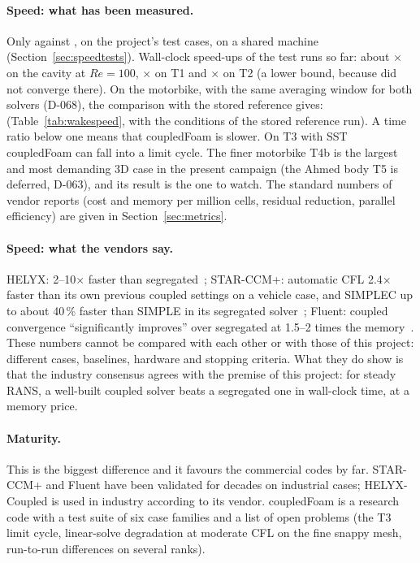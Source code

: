 \paragraph{Speed: what has been measured.} Only against ,
on the project's test cases, on a shared machine
(Section~\ref{sec:speedtests}). Wall-clock speed-ups of the test runs so
far: about $\times$ on the cavity at
$Re=100$, $\times$ on T1 and
$\times$ on T2 (a lower bound, because
 did not converge there). On the motorbike, with the
same averaging window for both solvers (D-068), the comparison with the
stored reference gives:  (Table~\ref{tab:wakespeed},
with the conditions of the stored reference run). A time ratio below one
means that coupledFoam is slower. On T3 with SST coupledFoam can fall
into a limit cycle. The finer motorbike T4b is the largest and most
demanding 3D case in the present campaign (the Ahmed body T5 is deferred, D-063), and its
result is the one to watch. The standard numbers of vendor reports (cost
and memory per million cells, residual reduction, parallel efficiency) are
given in Section~\ref{sec:metrics}.

\paragraph{Speed: what the vendors say.} HELYX: 2--10$\times$ faster than
segregated~\cite{cmp-HelyxCoupled}; STAR-CCM+: automatic CFL 2.4$\times$ faster
than its own previous coupled settings on a vehicle case, and SIMPLEC up
to about 40\,\% faster than SIMPLE in its segregated
solver~\cite{cmp-StarEffortless2020,cmp-StarSIMPLEC2023}; Fluent: coupled
convergence ``significantly improves'' over segregated at 1.5--2 times the
memory~\cite{cmp-Fluent12TG}. These numbers cannot be compared with each
other or with those of this project: different cases, baselines, hardware
and stopping criteria. What they do show is that the industry consensus
agrees with the premise of this project: for steady RANS, a well-built
coupled solver beats a segregated one in wall-clock time, at a memory
price.

\paragraph{Maturity.} This is the biggest difference and it favours the
commercial codes by far. STAR-CCM+ and Fluent have been validated for
decades on industrial cases; HELYX-Coupled is used in industry according
to its vendor. coupledFoam is a research code with a test
suite of six case families and a list of open problems (the T3 limit
cycle, linear-solve degradation at moderate CFL on the fine snappy mesh,
run-to-run differences on several ranks).

